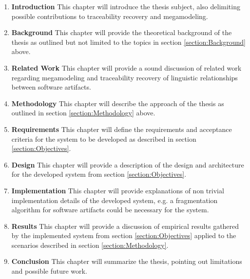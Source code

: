 \documentclass[runningheads,a4paper]{llncs}
\begin{document}
\begin{enumerate}

\item
\textbf{Introduction}
This chapter will introduce the thesis subject, also delimiting possible contributions to traceability recovery and megamodeling.

\item
\textbf{Background}
This chapter will provide the theoretical background of the thesis as outlined but not limited to the topics in section \ref{section:Background} above.

\item
\textbf{Related Work}
This chapter will provide a sound discussion of related work regarding megamodeling and traceability recovery of linguistic relationships between software artifacts.

\item
\textbf{Methodology}
This chapter will describe the approach of the thesis as outlined in section \ref{section:Methodology} above.

\item
\textbf{Requirements}
This chapter will define the requirements and acceptance criteria for the system to be developed as described in section \ref{section:Objectives}.

\item
\textbf{Design}
This chapter will provide a description of the design and architecture for the developed system from section \ref{section:Objectives}.

\item
\textbf{Implementation}
This chapter will provide explanations of non trivial implementation details of the developed system, e.g. a fragmentation algorithm for software artifacts could be necessary for the system.

\item
\textbf{Results}
This chapter will provide a discussion of empirical results gathered by the implemented system from section \ref{section:Objectives} applied to the scenarios described in section \ref{section:Methodology}.

\item
\textbf{Conclusion}
This chapter will summarize the thesis, pointing out limitations and possible future work.

\end{enumerate}






{}

\end{document}
